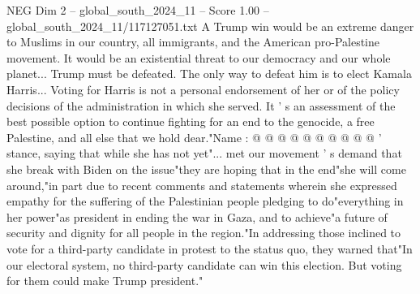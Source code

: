 \begin{textsample}{NEG Dim 2 – global\_south\_2024\_11 – Score 1.00 – global\_south\_2024\_11/117127051.txt}
A Trump win would be an extreme danger to Muslims in our country, all immigrants, and the American pro-Palestine movement.
It would be an existential threat to our democracy and our whole planet...
Trump must be defeated.
The only way to defeat him is to elect Kamala Harris...
Voting for Harris is not a personal endorsement of her or of the policy decisions of the administration in which she served.
It ' s an assessment of the best possible option to continue fighting for an end to the genocide, a free Palestine, and all else that we hold dear."Name : @ @ @ @ @ @ @ @ @ @ ' stance, saying that while she has not yet"... met our movement ' s demand that she break with Biden on the issue"they are hoping that in the end"she will come around,"in part due to recent comments and statements wherein she expressed empathy for the suffering of the Palestinian people pledging to do"everything in her power"as president in ending the war in Gaza, and to achieve"a future of security and dignity for all people in the region."In addressing those inclined to vote for a third-party candidate in protest to the status quo, they warned that"In our electoral system, no third-party candidate can win this election.
But voting for them could make Trump president."

\end{textsample}
